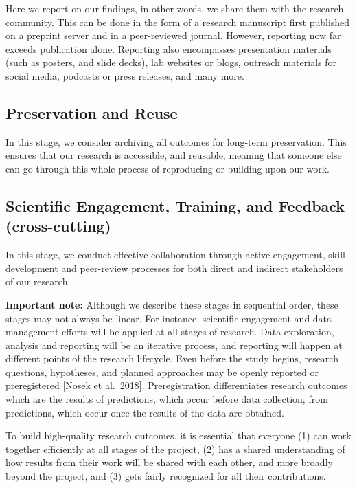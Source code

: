 \documentclass[
  letterpaper,
  DIV=11,
  numbers=noendperiod]{scrreport}
\begin{document}
Here we report on our findings, in other words, we share them with the
research community. This can be done in the form of a research
manuscript first published on a preprint server and in a peer-reviewed
journal. However, reporting now far exceeds publication alone. Reporting
also encompasses presentation materials (such as posters, and slide
decks), lab websites or blogs, outreach materials for social media,
podcasts or press releases, and many more.

\hypertarget{preservation-and-reuse}{%
\subsection{Preservation and Reuse}\label{preservation-and-reuse}}

In this stage, we consider archiving all outcomes for long-term
preservation. This ensures that our research is accessible, and
reusable, meaning that someone else can go through this whole process of
reproducing or building upon our work.

\hypertarget{scientific-engagement-training-and-feedback-cross-cutting}{%
\subsection{Scientific Engagement, Training, and Feedback
(cross-cutting)}\label{scientific-engagement-training-and-feedback-cross-cutting}}

In this stage, we conduct effective collaboration through active
engagement, skill development and peer-review processes for both direct
and indirect stakeholders of our research.

\textbf{Important note:} Although we describe these stages in sequential
order, these stages may not always be linear. For instance, scientific
engagement and data management efforts will be applied at all stages of
research. Data exploration, analysis and reporting will be an iterative
process, and reporting will happen at different points of the research
lifecycle. Even before the study begins, research questions, hypotheses,
and planned approaches may be openly reported or preregistered
{[}\href{https://www.pnas.org/doi/10.1073/pnas.1708274114}{Nosek et
al.~2018}{]}. Preregistration differentiates research outcomes which are
the results of predictions, which occur before data collection, from
predictions, which occur once the results of the data are obtained.

To build high-quality research outcomes, it is essential that everyone
(1) can work together efficiently at all stages of the project, (2) has
a shared understanding of how results from their work will be shared
with each other, and more broadly beyond the project, and (3) gets
fairly recognized for all their contributions.
\end{document}
